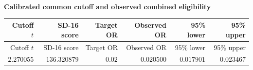 
\begingroup\small
\setlength{\tabcolsep}{4pt}
\noindent\textbf{Calibrated common cutoff and observed combined eligibility}
\begin{longtable}{rrrrrr}
\toprule
Cutoff $t$ & SD-16 score & Target OR & Observed OR & 95\% lower & 95\% upper \\
\midrule
\endfirsthead
Cutoff $t$ & SD-16 score & Target OR & Observed OR & 95\% lower & 95\% upper \\
\midrule
\endhead
\bottomrule
\endfoot
$2.270055$ & $136.320879$ & $0.02$ & $0.020500$ & $0.017901$ & $0.023467$ \\
\end{longtable}
\endgroup
